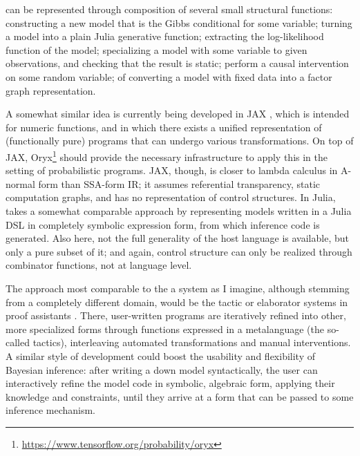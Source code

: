  can be represented through composition of several small structural
functions: constructing a new model that is the Gibbs conditional for some variable; turning a model
into a plain Julia generative function; extracting the log-likelihood function of the model;
specializing a model with some variable to given observations, and checking that the result is
static; perform a causal intervention on some random variable; of converting a model with fixed data
into a factor graph representation.

A somewhat similar idea is currently being developed in JAX \parencite{bradbury2018jax}, which is
intended for numeric functions, and in which there exists a unified representation of (functionally
pure) programs that can undergo various transformations.  On top of JAX,
Oryx\footnote{\protect\url{https://www.tensorflow.org/probability/oryx}} should provide the
necessary infrastructure to apply this in the setting of probabilistic programs.  JAX, though, is
closer to lambda calculus in A-normal form than SSA-form IR; it assumes referential transparency,
static computation graphs, and has no representation of control structures.  In Julia,
 \parencite{scherrer2019soss} takes a somewhat comparable approach by
representing models written in a Julia DSL in completely symbolic expression form, from which
inference code is generated.  Also here, not the full generality of the host language is available,
but only a pure subset of it; and again, control structure can only be realized through combinator
functions, not at language level.

The approach most comparable to the a system as I imagine, although stemming from a completely
different domain, would be the tactic or elaborator systems in proof assistants
\parencite[e.g.,][]{brady2013idris,coqdevelopmentteam2020coq}.  There, user-written programs are
iteratively refined into other, more specialized forms through functions expressed in a metalanguage
(the so-called tactics), interleaving automated transformations and manual interventions.  A similar
style of development could boost the usability and flexibility of Bayesian inference: after writing
a down model syntactically, the user can interactively refine the model code in symbolic, algebraic
form, applying their knowledge and constraints, until they arrive at a form that can be passed to
some inference mechanism.

